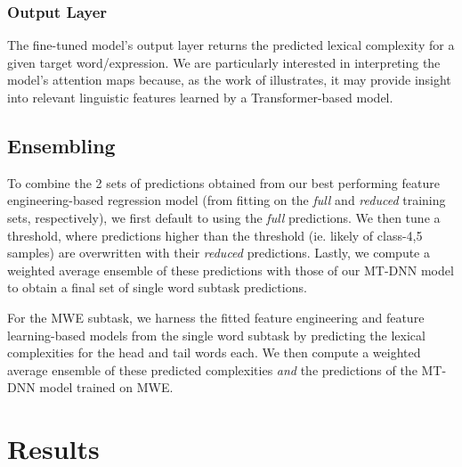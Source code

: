 \documentclass[11pt,a4paper]{article}
\begin{document}
\subsubsection{Output Layer}

The fine-tuned model's output layer returns the predicted lexical complexity for a given target word/expression. We are particularly interested in interpreting the model's attention maps because, as the work of \citep{DBLP:journals/corr/abs-1906-04341} illustrates, it may provide insight into relevant linguistic features learned by a Transformer-based model.

\subsection{Ensembling}

To combine the 2 sets of predictions obtained from our best performing feature engineering-based regression model (from fitting on the \textit{full} and \textit{reduced} training sets, respectively), we first default to using the \textit{full} predictions. We then tune a threshold, where predictions higher than the threshold (ie. likely of class-4,5 samples) are overwritten with their \textit{reduced} predictions. Lastly, we compute a weighted average ensemble of these predictions with those of our MT-DNN model to obtain a final set of single word subtask predictions. 

For the MWE subtask, we harness the fitted feature engineering and feature learning-based models from the single word subtask by predicting the lexical complexities for the head and tail words each. We then compute a weighted average ensemble of these predicted complexities \textit{and} the predictions of the MT-DNN model trained on MWE.

\section{Results}
\end{document}
